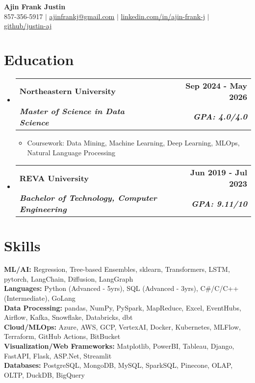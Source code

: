 \documentclass[letterpaper,11pt]{article}
\makeatletter
\newcommand{\resumeItem}[1]{
  \item\small{
    {#1 \vspace{-2pt}}
  }
}
\newcommand{\resumeSubheading}[4]{
  \vspace{-2pt}\item
    \begin{tabular*}{0.97\textwidth}[t]{l@{\extracolsep{\fill}}r}
      \textbf{#1} & #2 \\
      \textit{\small#3} & \textit{\small #4} \\
    \end{tabular*}\vspace{-7pt}
}
\newcommand{\resumeSubHeadingListStart}{\begin{itemize}[leftmargin=0.15in, label={}]}
\newcommand{\resumeSubHeadingListEnd}{\end{itemize}}
\newcommand{\resumeItemListStart}{\begin{itemize}}
\newcommand{\resumeItemListEnd}{\end{itemize}\vspace{-5pt}}
\makeatother
\begin{document}
\begin{center}
    \textbf{\Huge Ajin Frank Justin} \\
    \vspace{1pt}
    857-356-5917 $|$ 
    \href{mailto:ajinfrankj@gmail.com}{\underline{ajinfrankj@gmail.com}} $|$ 
    \href{https://www.linkedin.com/in/ajin-frank-j/}{\underline{linkedin.com/in/ajin-frank-j}} $|$ 
    \href{https://github.com/justin-aj}{\underline{github/justin-aj}} 
    
\end{center}

\vspace{-15pt}  %

\section{Education}
\resumeSubHeadingListStart
\resumeSubheading
{Northeastern University}{\textbf{Sep 2024 - May 2026}}
{\normalfont \textbf{Master of Science in Data Science}}
{\normalfont \textbf{GPA: 4.0/4.0}}
\resumeItemListStart
    \resumeItem{Coursework: Data Mining, Machine Learning, Deep Learning, MLOps, Natural Language Processing}
\resumeItemListEnd

\vspace{-1pt}  %

\resumeSubheading
{REVA University}{\textbf{Jun 2019 - Jul 2023}}
{\normalfont \textbf{Bachelor of Technology, Computer Engineering}}{\normalfont \textbf{GPA: 9.11/10}}
\resumeSubHeadingListEnd

\vspace{-10pt}  %

\section{Skills}
 \begin{itemize}[leftmargin=0.05in, label={}]
    \small{\item{
\textbf{ML/AI:} {Regression, Tree-based Ensembles, sklearn, Transformers, LSTM, pytorch, LangChain, Diffusion, LangGraph} \\
    \textbf{Languages:} {Python (Advanced - 5yrs), SQL (Advanced - 3yrs), C\#/C/C++ (Intermediate), GoLang} \\
    \textbf{Data Processing:} {pandas, NumPy, PySpark, MapReduce, Excel, EventHubs, Airflow, Kafka, Snowflake, Databricks, dbt} \\
    \textbf{Cloud/MLOps:} {Azure, AWS, GCP, VertexAI, Docker, Kubernetes, MLFlow, Terraform, GitHub Actions, BitBucket} \\
    \textbf{Visualization/Web Frameworks:} {Matplotlib, PowerBI, Tableau, Django, FastAPI, Flask, ASP.Net, Streamlit} \\
    \textbf{Databases:} {PostgreSQL, MongoDB, MySQL, SparkSQL, Pinecone, OLAP, OLTP, DuckDB, BigQuery}}}
\end{itemize}
\end{document}
